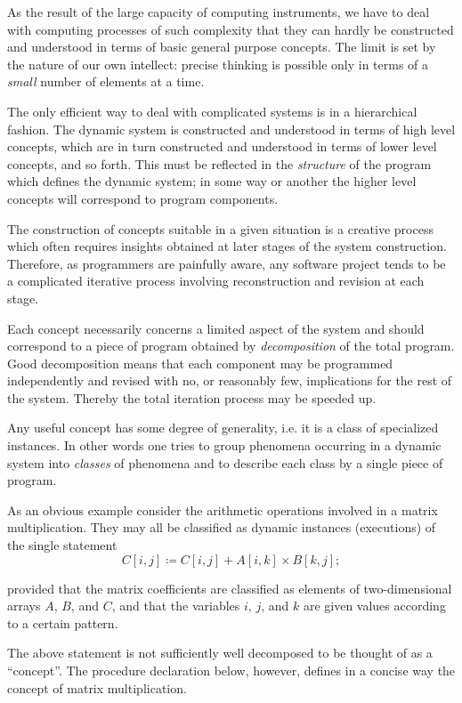 As the result of the large capacity of computing instruments, we have to deal with computing processes of such complexity that they can hardly be constructed and understood in terms of basic general purpose concepts. The limit is set by the nature of our own intellect: precise thinking is possible only in terms of a \textit{small} number of elements at a time.

The only efficient way to deal with complicated systems is in a hierarchical fashion. The dynamic system is constructed and understood in terms of high level concepts, which are in turn constructed and understood in terms of lower level concepts, and so forth. This must be reflected in the \textit{structure} of the program which defines the dynamic system; in some way or another the higher level concepts will correspond to program components.

The construction of concepts suitable in a given situation is a creative process which often requires insights obtained at later stages of the system construction. Therefore, as programmers are painfully aware, any software project tends to be a complicated iterative process involving reconstruction and revision at each stage.

Each concept necessarily concerns a limited aspect of the system and
should correspond to a piece of program obtained by \textit{decomposition} of the total program. Good decomposition means that each component may be programmed independently and revised with no, or reasonably few, implications for the rest of the system. Thereby the total iteration process may be speeded up.

Any useful concept has some degree of generality, i.e. it is a class of
specialized instances. In other words one tries to group phenomena occurring in a dynamic system into \textit{classes} of phenomena and to describe each class by a single piece of program.

As an obvious example consider the arithmetic operations involved in a matrix multiplication. They may all be classified as dynamic instances (executions) of the single statement
$$
C[i, j] \coloneq C[i,j] + A[i, k] \times B[k, j];
$$

\noindent
provided that the matrix coefficients are classified as elements of two-dimensional arrays $A$, $B$, and $C$, and that the variables $i$, $j$, and $k$ are given values according to a certain pattern.

The above statement is not sufficiently well decomposed to be thought of as a ``concept''. The procedure declaration below, however, defines in a concise way the concept of matrix multiplication.

